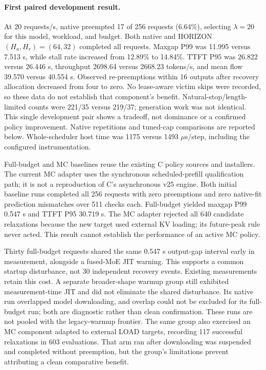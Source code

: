 \documentclass[11pt]{article}
\begin{document}
\paragraph{First paired development result.}
At 20 requests/s, native preempted 17 of 256 requests (6.64\%), selecting
$\lambda=20$ for this model, workload, and budget. Both native and
HORIZON $(H_a,H_r)=(64,32)$ completed all requests. Maxgap P99 was
11.995 versus 7.513 s, while stall rate increased from 12.89\% to 14.84\%.
TTFT P95 was 26.822 versus 26.446 s, throughput 2698.64 versus
2668.23 tokens/s, and mean flow 39.570 versus 40.554 s. Observed
re-preemptions within 16 outputs after recovery allocation decreased from
four to zero. No lease-aware victim skips were recorded, so these data
do not establish that component's benefit. Natural-stop/length-limited
counts were 221/35 versus 219/37; generation work was not identical.
This single development pair shows a tradeoff, not dominance or a
confirmed policy improvement. Native repetitions and tuned-cap comparisons
are reported below. Whole-scheduler host time was 1175 versus 1493
$\mu$s/step, including the configured instrumentation.

Full-budget and MC baselines reuse the existing C policy sources and
installers. The current MC adapter uses the synchronous scheduled-prefill
qualification path; it is not a reproduction of C's asynchronous v25
engine. Both initial baseline runs completed all 256 requests with zero
preemptions and zero native-fit prediction mismatches over 511 checks each.
Full-budget yielded maxgap P99 0.547 s and TTFT P95 30.719 s. The MC
adapter rejected all 640 candidate relaxations because the new target used
external KV loading; its future-peak rule never acted. This result cannot
establish the performance of an active MC policy.

Thirty full-budget requests shared the same 0.547 s output-gap interval
early in measurement, alongside a fused-MoE JIT warning. This supports a
common startup disturbance, not 30 independent recovery events. Existing
measurements retain this cost. A separate broader-shape warmup group still
exhibited measurement-time JIT and did not eliminate the shared disturbance.
Its native run overlapped model downloading, and overlap could not be
excluded for its full-budget run; both are diagnostic rather than clean
confirmation. These runs are not pooled with the legacy-warmup frontier.
The same group also exercised an MC component adapted to external LOAD
targets, recording 117 successful relaxations in 603 evaluations. That arm
ran after downloading was suspended and completed without preemption, but
the group's limitations prevent attributing a clean comparative benefit.
\end{document}
